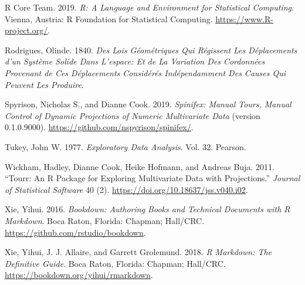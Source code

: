 \documentclass[11,]{article}
\begin{document}
\leavevmode\hypertarget{ref-r_core_team_r:_2019}{}%
R Core Team. 2019. \emph{R: A Language and Environment for Statistical Computing}. Vienna, Austria: R Foundation for Statistical Computing. \url{https://www.R-project.org/}.

\leavevmode\hypertarget{ref-rodrigues_lois_1840}{}%
Rodrigues, Olinde. 1840. \emph{Des Lois Géométriques Qui Régissent Les Déplacements d'un Système Solide Dans L'espace: Et de La Variation Des Cordonnées Provenant de Ces Déplacements Considérés Indépendamment Des Causes Qui Peuvent Les Produire}.

\leavevmode\hypertarget{ref-spyrison_spinifex_2019}{}%
Spyrison, Nicholas S., and Dianne Cook. 2019. \emph{Spinifex: Manual Tours, Manual Control of Dynamic Projections of Numeric Multivariate Data} (version 0.1.0.9000). \url{https://github.com/nspyrison/spinifex/}.

\leavevmode\hypertarget{ref-tukey_exploratory_1977}{}%
Tukey, John W. 1977. \emph{Exploratory Data Analysis}. Vol. 32. Pearson.

\leavevmode\hypertarget{ref-wickham_tourr:_2011}{}%
Wickham, Hadley, Dianne Cook, Heike Hofmann, and Andreas Buja. 2011. ``Tourr: An R Package for Exploring Multivariate Data with Projections.'' \emph{Journal of Statistical Software} 40 (2). \url{https://doi.org/10.18637/jss.v040.i02}.

\leavevmode\hypertarget{ref-xie_bookdown:_2016}{}%
Xie, Yihui. 2016. \emph{Bookdown: Authoring Books and Technical Documents with R Markdown}. Boca Raton, Florida: Chapman; Hall/CRC. \url{https://github.com/rstudio/bookdown}.

\leavevmode\hypertarget{ref-xie_r_2018}{}%
Xie, Yihui, J. J. Allaire, and Garrett Grolemund. 2018. \emph{R Markdown: The Definitive Guide}. Boca Raton, Florida: Chapman; Hall/CRC. \url{https://bookdown.org/yihui/rmarkdown}.
\end{document}
